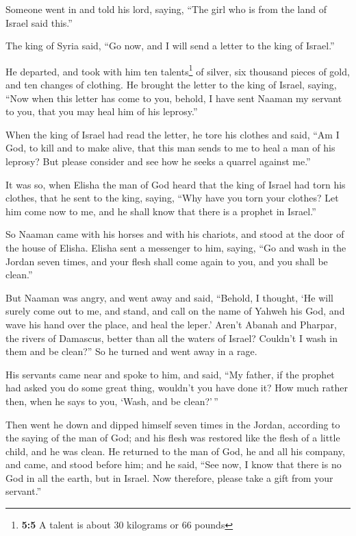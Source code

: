  Someone went in and told his lord, saying, ``The girl who
is from the land of Israel said this.''

 The king of Syria said, ``Go now, and I will send a
letter to the king of Israel.''

He departed, and took with him ten talents\footnote{\textbf{5:5} A
  talent is about 30 kilograms or 66 pounds} of silver, six thousand
pieces of gold, and ten changes of clothing.  He brought
the letter to the king of Israel, saying, ``Now when this letter has
come to you, behold, I have sent Naaman my servant to you, that you may
heal him of his leprosy.''

 When the king of Israel had read the letter, he tore his
clothes and said, ``Am I God, to kill and to make alive, that this man
sends to me to heal a man of his leprosy? But please consider and see
how he seeks a quarrel against me.''

 It was so, when Elisha the man of God heard that the king
of Israel had torn his clothes, that he sent to the king, saying, ``Why
have you torn your clothes? Let him come now to me, and he shall know
that there is a prophet in Israel.''

 So Naaman came with his horses and with his chariots, and
stood at the door of the house of Elisha.  Elisha sent a
messenger to him, saying, ``Go and wash in the Jordan seven times, and
your flesh shall come again to you, and you shall be clean.''

 But Naaman was angry, and went away and said, ``Behold,
I thought, `He will surely come out to me, and stand, and call on the
name of Yahweh his God, and wave his hand over the place, and heal the
leper.'  Aren't Abanah and Pharpar, the rivers of
Damascus, better than all the waters of Israel? Couldn't I wash in them
and be clean?'' So he turned and went away in a rage.

 His servants came near and spoke to him, and said, ``My
father, if the prophet had asked you do some great thing, wouldn't you
have done it? How much rather then, when he says to you, `Wash, and be
clean?'\,''

 Then went he down and dipped himself seven times in the
Jordan, according to the saying of the man of God; and his flesh was
restored like the flesh of a little child, and he was clean.
 He returned to the man of God, he and all his company,
and came, and stood before him; and he said, ``See now, I know that
there is no God in all the earth, but in Israel. Now therefore, please
take a gift from your servant.''

